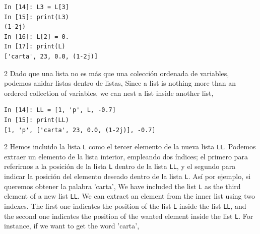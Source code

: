 \begin{center}
    \begin{minipage}{0.2\textwidth}
\begin{verbatim}
In [14]: L3 = L[3]
In [15]: print(L3)
(1-2j)
In [16]: L[2] = 0.
In [17]: print(L)
['carta', 23, 0.0, (1-2j)]
\end{verbatim}        
    \end{minipage}
\end{center}

\begin{paracol}{2}
Dado que una lista no es más que una colección ordenada de variables, podemos anidar listas dentro de listas,
\switchcolumn
Since a list is nothing more than an ordered collection of variables, we can nest a list inside another list,
\end{paracol}

\begin{center}
\begin{minipage}{0.3\textwidth}
\begin{verbatim}
In [14]: LL = [1, 'p', L, -0.7]
In [15]: print(LL)
[1, 'p', ['carta', 23, 0.0, (1-2j)], -0.7]
\end{verbatim}
\end{minipage}
\end{center}

\begin{paracol}{2}
Hemos incluido la lista \texttt{L} como el tercer elemento de la nueva lista \texttt{LL}. Podemos extraer un elemento de la lista interior, empleando dos índices; el primero para referirnos a la posición de la lista \texttt{L} dentro de la lista  \texttt{LL}, y el segundo para indicar la posición del elemento deseado dentro de la lista \texttt{L}. Así por ejemplo, si queremos obtener la palabra 'carta',
\switchcolumn
We have included the list \texttt{L} as the third element of a new list \texttt{LL}. We can extract an element from the inner list using two indexes. The first one indicates the position of the list \texttt{L} inside the list \texttt{LL}, and the second one indicates the position of the wanted element inside the list \texttt{L}. For instance, if we want to get the word 'carta',
\end{paracol}


